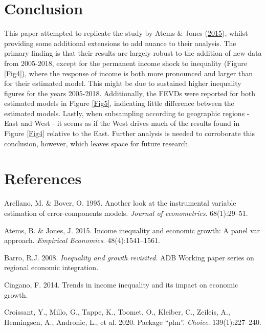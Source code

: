 \documentclass[11pt,preprint, authoryear]{elsarticle}
\numberwithin{equation}{section}
\numberwithin{figure}{section}
\numberwithin{table}{section}
\begin{document}
\hypertarget{conclusion}{%
\section{\texorpdfstring{Conclusion
\label{Section 4}}{Conclusion }}\label{conclusion}}

This paper attempted to replicate the study by Atems \& Jones
(\protect\hyperlink{ref-atems}{2015}), whilst providing some additional
extensions to add nuance to their analysis. The primary finding is that
their results are largely robust to the addition of new data from
2005-2018, except for the permanent income shock to inequality (Figure
\ref{Fig4}), where the response of income is both more pronounced and
larger than for their estimated model. This might be due to sustained
higher inequality figures for the years 2005-2018. Additionally, the
FEVDs were reported for both estimated models in Figure \ref{Fig5},
indicating little difference between the estimated models. Lastly, when
subsampling according to geographic regions - East and West - it seems
as if the West drives much of the results found in Figure \ref{Fig4}
relative to the East. Further analysis is needed to corroborate this
conclusion, however, which leaves space for future research.

\newpage

\hypertarget{references}{%
\section*{References}\label{references}}

\hypertarget{refs}{}
\leavevmode\hypertarget{ref-arellano}{}%
Arellano, M. \& Bover, O. 1995. Another look at the instrumental
variable estimation of error-components models. \emph{Journal of
econometrics}. 68(1):29--51.

\leavevmode\hypertarget{ref-atems}{}%
Atems, B. \& Jones, J. 2015. Income inequality and economic growth: A
panel var approach. \emph{Empirical Economics}. 48(4):1541--1561.

\leavevmode\hypertarget{ref-barro}{}%
Barro, R.J. 2008. \emph{Inequality and growth revisited}. ADB Working
paper series on regional economic integration.

\leavevmode\hypertarget{ref-cingano}{}%
Cingano, F. 2014. Trends in income inequality and its impact on economic
growth.

\leavevmode\hypertarget{ref-croissant2020package}{}%
Croissant, Y., Millo, G., Tappe, K., Toomet, O., Kleiber, C., Zeileis,
A., Henningsen, A., Andronic, L., et al. 2020. Package ``plm''.
\emph{Choice}. 139(1):227--240.
\end{document}
